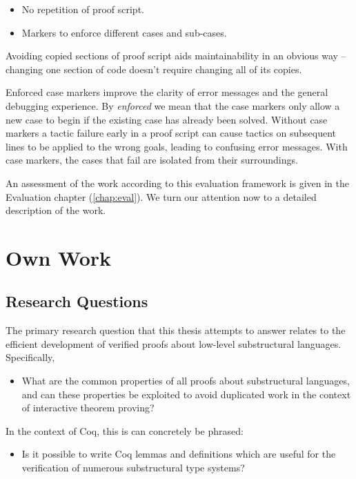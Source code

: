 \documentclass[]{unswthesis}
\let\i\textit
\begin{document}
\begin{itemize}
\item No repetition of proof script.
\item Markers to enforce different cases and sub-cases.
\end{itemize}

Avoiding copied sections of proof script aids maintainability in an obvious way -- changing one section of code doesn't require changing all of its copies.

Enforced case markers improve the clarity of error messages and the general debugging experience. By \i{enforced} we mean that the case markers only allow a new case to begin if the existing case has already been solved. Without case markers a tactic failure early in a proof script can cause tactics on subsequent lines to be applied to the wrong goals, leading to confusing error messages. With case markers, the cases that fail are isolated from their surroundings.

An assessment of the work according to this evaluation framework is given in the Evaluation chapter (\cref{chap:eval}). We turn our attention now to a detailed description of the work.

\chapter{Own Work}

\section{Research Questions}

The primary research question that this thesis attempts to answer relates to the efficient development of verified proofs about low-level substructural languages. Specifically,

\begin{itemize}
\item What are the common properties of all proofs about substructural languages, and can these properties be exploited to avoid duplicated work in the context of interactive theorem proving?
\end{itemize}

In the context of Coq, this is can concretely be phrased:

\begin{itemize}
\item Is it possible to write Coq lemmas and definitions which are useful for the verification of numerous substructural type systems?
\end{itemize}
\end{document}
